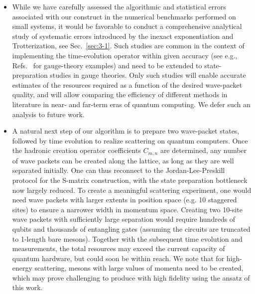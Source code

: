 \documentclass[a4paper,onecolumn,11pt,accepted=2024-10-11]{quantumarticle}
\begin{document}
\begin{itemize}
%
\item[$\diamond$]{While we have carefully assessed the algorithmic and statistical errors associated with our construct in the numerical benchmarks performed on small systems, it would be favorable to conduct a comprehensive analytical study of systematic errors introduced by the inexact exponentiation and Trotterization, see Sec.~\ref{sec:3-1}. Such studies are common in the context of implementing the time-evolution operator within given accuracy (see e.g., Refs.~\cite{Shaw:2020udc,Kan:2021xfc,Davoudi:2022xmb} for gauge-theory examples) and need to be extended to state-preparation studies in gauge theories. Only such studies will enable accurate estimates of the resources required as a function of the desired wave-packet quality, and will allow comparing the efficiency of different methods in literature in near- and far-term eras of quantum computing. We defer such an analysis to future work.
}
%
\item[$\diamond$]{A natural next step of our algorithm is to prepare two wave-packet states, followed by time evolution to realize scattering on quantum computers. Once the hadronic creation operator coefficients $C_{m,n}$ are determined, any number of wave packets can be created along the lattice, as long as they are well separated initially. One can thus reconnect to the Jordan-Lee-Preskill protocol for the S-matrix construction, with the state preparation bottleneck now largely reduced. To create a meaningful scattering experiment, one would need wave packets with larger extents in position space (e.g. 10 staggered sites) to ensure a narrower width in momentum space. Creating two 10-site wave packets with sufficiently large separation would require hundreds of qubits and thousands of entangling gates (assuming the circuits are truncated to 1-length bare mesons). Together with the subsequent time evolution and measurements, the total resources may exceed the current capacity of quantum hardware, but could soon be within reach. We note that for high-energy scattering, mesons with large values of momenta need to be created, which may prove challenging to produce with high fidelity using the ansatz of this work.}
%

\end{itemize}
\end{document}
